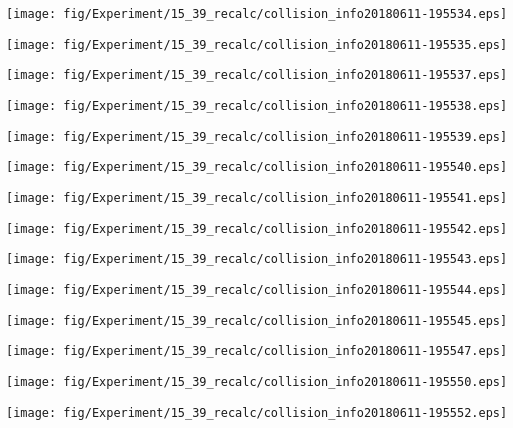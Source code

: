 \texttt{[image: fig/Experiment/15\_39\_recalc/collision\_info20180611-195534.eps]}

\texttt{[image: fig/Experiment/15\_39\_recalc/collision\_info20180611-195535.eps]}

\texttt{[image: fig/Experiment/15\_39\_recalc/collision\_info20180611-195537.eps]}

\texttt{[image: fig/Experiment/15\_39\_recalc/collision\_info20180611-195538.eps]}

\texttt{[image: fig/Experiment/15\_39\_recalc/collision\_info20180611-195539.eps]}

\texttt{[image: fig/Experiment/15\_39\_recalc/collision\_info20180611-195540.eps]}

\texttt{[image: fig/Experiment/15\_39\_recalc/collision\_info20180611-195541.eps]}

\texttt{[image: fig/Experiment/15\_39\_recalc/collision\_info20180611-195542.eps]}

\texttt{[image: fig/Experiment/15\_39\_recalc/collision\_info20180611-195543.eps]}

\texttt{[image: fig/Experiment/15\_39\_recalc/collision\_info20180611-195544.eps]}

\texttt{[image: fig/Experiment/15\_39\_recalc/collision\_info20180611-195545.eps]}

\texttt{[image: fig/Experiment/15\_39\_recalc/collision\_info20180611-195547.eps]}

\texttt{[image: fig/Experiment/15\_39\_recalc/collision\_info20180611-195550.eps]}

\texttt{[image: fig/Experiment/15\_39\_recalc/collision\_info20180611-195552.eps]}

